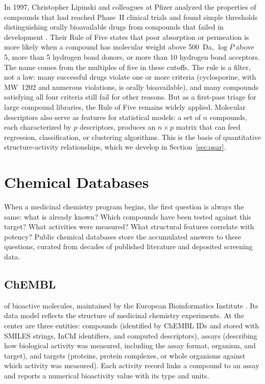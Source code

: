 In 1997, Christopher Lipinski and colleagues at Pfizer analyzed the properties of compounds that had reached Phase~II clinical trials and found simple thresholds distinguishing orally bioavailable drugs from compounds that failed in development \cite{lipinski2001}. Their Rule of Five states that poor absorption or permeation is more likely when a compound has molecular weight above 500~Da, $\log P$ above 5, more than 5 hydrogen bond donors, or more than 10 hydrogen bond acceptors. The name comes from the multiples of five in these cutoffs. The rule is a filter, not a law: many successful drugs violate one or more criteria (cyclosporine, with MW~1202 and numerous violations, is orally bioavailable), and many compounds satisfying all four criteria still fail for other reasons. But as a first-pass triage for large compound libraries, the Rule of Five remains widely applied. Molecular descriptors also serve as features for statistical models: a set of $n$ compounds, each characterized by $p$ descriptors, produces an $n \times p$ matrix that can feed regression, classification, or clustering algorithms. This is the basis of quantitative structure-activity relationships, which we develop in Section~\ref{sec:qsar}.


\section{Chemical Databases}
\label{sec:chem-databases}

When a medicinal chemistry program begins, the first question is always the same: what is already known? Which compounds have been tested against this target? What activities were measured? What structural features correlate with potency? Public chemical databases store the accumulated answers to these questions, curated from decades of published literature and deposited screening data.


\subsection{ChEMBL}
\label{sec:chembl}

 of bioactive molecules, maintained by the European Bioinformatics Institute \cite{gaulton2012}. Its data model reflects the structure of medicinal chemistry experiments. At the center are three entities: compounds (identified by ChEMBL IDs and stored with SMILES strings, InChI identifiers, and computed descriptors), assays (describing how biological activity was measured, including the assay format, organism, and target), and targets (proteins, protein complexes, or whole organisms against which activity was measured). Each activity record links a compound to an assay and reports a numerical bioactivity value with its type and units.

